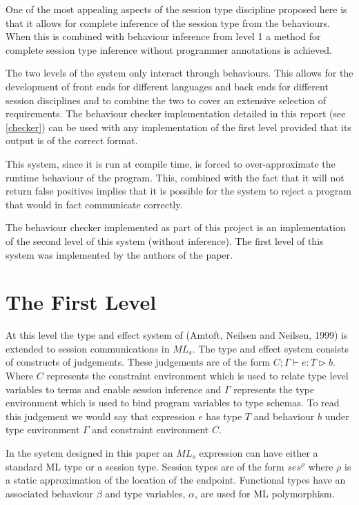 One of the most appealing aspects of the session type discipline proposed here is that it allows for complete inference of the session type from the behaviours. When this is combined with behaviour inference from level 1 a method for complete session type inference without programmer annotations is achieved. 

The two levels of the system only interact through behaviours. This allows for the development of front ends for different languages and back ends for different session disciplines and to combine the two to cover an extensive selection of requirements. The behaviour checker implementation detailed in this report (see \ref{checker}) can be used with any implementation of the first level provided that its output is of the correct format.

This system, since it is run at compile time, is forced to over-approximate the runtime behaviour of the program. This, combined with the fact that it will not return false positives implies that it is possible for the system to reject a program that would in fact communicate correctly. 

The behaviour checker implemented as part of this project is an implementation of the second level of this system (without inference). The first level of this system was implemented by the authors of the paper. 

\section{The First Level} \label{level1}

At this level the type and effect system of (Amtoft, Neilsen and Neilsen, 1999) \cite{amtoft} is extended to session communications in $ML_s$. The type and effect system consists of constructs of judgements. These judgements are of the form $C;\Gamma \vdash e : T \triangleright b$. Where $C$ represents the constraint environment which is used to relate type level variables to terms and enable session inference and $\Gamma$ represents the type environment which is used to bind program variables to type schemas. To read this judgement we would say that expression $e$ has type $T$ and behaviour $b$ under type environment $\Gamma$ and constraint environment $C$.

In the system designed in this paper \cite{paper1} an $ML_s$ expression can have either a standard ML type or a session type. Session types are of the form $ses^\rho$ where $\rho$ is a static approximation of the location of the endpoint. Functional types have an associated behaviour $\beta$ and type variables, $\alpha$, are used for ML polymorphism. 


